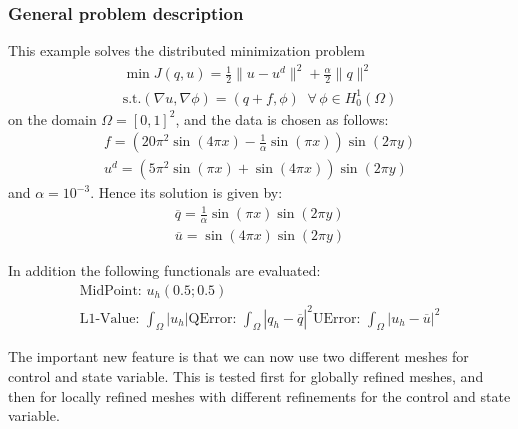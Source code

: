 \subsubsection{General problem description}
This example solves the distributed minimization problem
\begin{gather*}
\min J(q,u) = \frac{1}{2} \|u-u^d\|^2 + \frac{\alpha}{2}\|q\|^2\\
\text{s.t.} (\nabla u,\nabla \phi) = (q+f,\phi)\;\;\forall\,\phi \in H^1_0(\Omega)
\end{gather*}
on the domain $\Omega = [0,1]^2$, and the data is chosen as follows:
\begin{gather*}
 f = \left(20\pi^2  \sin(4 \pi x) - \frac{1}{\alpha}  \sin(\pi x)\right) \sin(2 \pi y)\\
 u^d = \left( 5 \pi^2 \sin(\pi x) + \sin(4 \pi x)\right)  \sin(2\pi y)
\end{gather*}
and $\alpha = 10^{-3}$.
Hence its solution is given by:
\begin{gather*}
 \overline{q} = \frac{1}{\alpha} \sin(\pi x) \sin(2 \pi y)\\
 \overline{u} = \sin(4 \pi x) \sin(2 \pi y)
\end{gather*}

In addition the following functionals are evaluated:
\begin{gather*}
  \text{MidPoint: } u_h(0.5 ; 0.5)\\[2mm]
  \text{L1-Value: }\int_\Omega |u_h|
  \text{QError: }\int_\Omega |q_h-\overline{q}|^2
  \text{UError: }\int_\Omega |u_h-\overline{u}|^2
\end{gather*}

The important new feature is that we can now use two different meshes for control and state variable.
This is tested first for globally refined meshes, and then for locally refined meshes with different refinements 
for the control and state variable.
